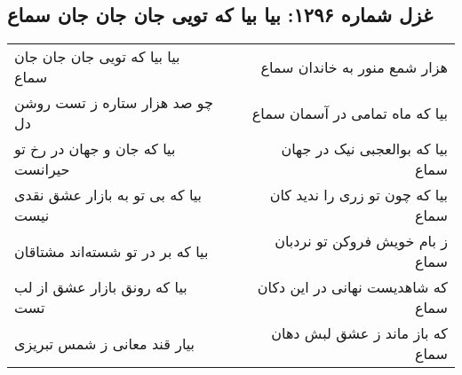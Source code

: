 \begin{center}
\section*{غزل شماره ۱۲۹۶: بیا بیا که تویی جان جان جان سماع}
\label{sec:1296}
\begin{longtable}{l p{0.5cm} r}
بیا بیا که تویی جان جان جان سماع
&&
هزار شمع منور به خاندان سماع
\\
چو صد هزار ستاره ز تست روشن دل
&&
بیا که ماه تمامی در آسمان سماع
\\
بیا که جان و جهان در رخ تو حیرانست
&&
بیا که بوالعجبی نیک در جهان سماع
\\
بیا که بی تو به بازار عشق نقدی نیست
&&
بیا که چون تو زری را ندید کان سماع
\\
بیا که بر در تو شسته‌اند مشتاقان
&&
ز بام خویش فروکن تو نردبان سماع
\\
بیا که رونق بازار عشق از لب تست
&&
که شاهدیست نهانی در این دکان سماع
\\
بیار قند معانی ز شمس تبریزی
&&
که باز ماند ز عشق لبش دهان سماع
\\
\end{longtable}
\end{center}
